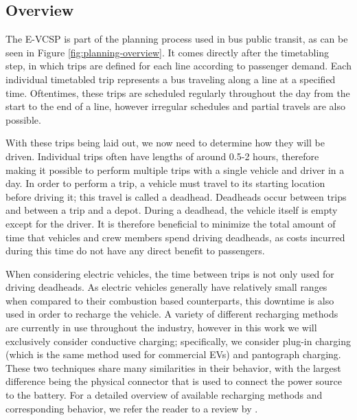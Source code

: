 \documentclass[]{article}
\begin{document}
\subsection{Overview}
The E-VCSP is part of the planning process used in bus public transit, as can be seen in Figure \ref{fig:planning-overview}. It comes directly after the timetabling step, in which trips are defined for each line according to passenger demand. Each individual timetabled trip represents a bus traveling along a line at a specified time. Oftentimes, these trips are scheduled regularly throughout the day from the start to the end of a line, however irregular schedules and partial travels are also possible.

With these trips being laid out, we now need to determine how they will be driven. Individual trips often have lengths of around 0.5-2 hours, therefore making it possible to perform multiple trips with a single vehicle and driver in a day. In order to perform a trip, a vehicle must travel to its starting location before driving it; this travel is called a deadhead. Deadheads occur between trips and between a trip and a depot. During a deadhead, the vehicle itself is empty except for the driver. It is therefore beneficial to minimize the total amount of time that vehicles and crew members spend driving deadheads, as costs incurred during this time do not have any direct benefit to passengers.

When considering electric vehicles, the time between trips is not only used for driving deadheads. As electric vehicles generally have relatively small ranges when compared to their combustion based counterparts, this downtime is also used in order to recharge the vehicle. A variety of different recharging methods are currently in use throughout the industry, however in this work we will exclusively consider conductive charging; specifically, we consider plug-in charging (which is the same method used for commercial EVs) and pantograph charging. These two techniques share many similarities in their behavior, with the largest difference being the physical connector that is used to connect the power source to the battery. For a detailed overview of available recharging methods and corresponding behavior, we refer the reader to a review by \citet{Zhou2024}.
\end{document}
